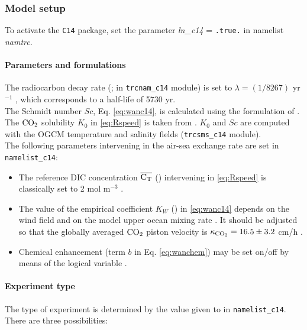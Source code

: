 \documentclass[../main/TOP_manual]{subfiles}
\begin{document}

%
\subsubsection{Model setup}
\label{sec:setup}

To activate the \texttt{C14} package, set the parameter \textit{ln\_c14} = \texttt{.true.} in namelist \textit{namtrc}.

\paragraph{Parameters and formulations}
\label{sec:param}
The radiocarbon decay rate (; in \texttt{trcnam\_c14} module) is set to $\lambda=(1/8267)$ yr$^{-1}$ \citep{stuiver_1977}, which corresponds to a half-life of 5730 yr.\\[1pt]
%
The Schmidt number $Sc$, Eq. \autoref{eq:wanc14}, is calculated using the formulation of \cite{wanninkhof_2014}.
The $\mathrm{CO_2}$ solubility $K_0$ in \autoref{eq:Rspeed} is taken from \cite{weiss_1974}. $K_0$ and $Sc$ are computed with the OGCM temperature and salinity fields (\texttt{trcsms\_c14} module).\\[1pt]
%
The following parameters intervening in the air-sea exchange rate are set in \texttt{namelist\_c14}:

\begin{itemize}
\item The reference DIC concentration $\overline{\mathrm{C_T}}$ () intervening in \autoref{eq:Rspeed} is classically set to 2 mol m$^{-3}$ \citep{toggweiler_1989a,orr_2001,butzin_2005}.
%
\item The value of the empirical coefficient $K_W$ () in \autoref{eq:wanc14} depends on the wind field and on the model upper ocean mixing rate \citep{toggweiler_1989a,wanninkhof_1992,naegler_2009,wanninkhof_2014}.
It should be adjusted so that the globally averaged $\mathrm{CO_2}$ piston velocity is $\kappa_{\mathrm{CO_2}} = 16.5\pm 3.2$ cm/h \citep{naegler_2009}.
%
\item Chemical enhancement (term $b$  in Eq. \autoref{eq:wanchem}) may be set on/off by means of the logical variable .
\end{itemize}

%
\paragraph{Experiment type}
The type of experiment is determined by the value given to  in \texttt{namelist\_c14}.
There are three possibilities:
\end{document}
